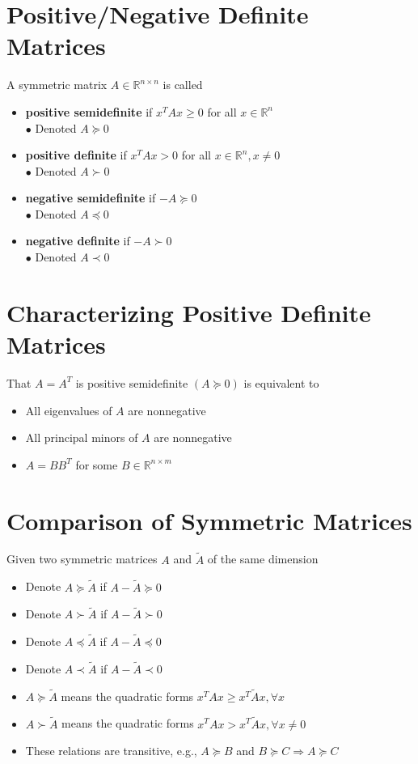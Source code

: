 \documentclass[10pt,a4paper,oneside]{article}
\begin{document}
\section{Positive/Negative Definite Matrices}
A symmetric matrix $A \in \mathbb{R}^{n \times n}$ is called
\begin{itemize}
\item {\bfseries positive semidefinite} if $x^{T} A x \geq 0$ for all $x \in \mathbb{R}^{n}$\\
$\bullet$ Denoted $A \succeq 0$
\item {\bfseries positive definite} if $x^{T} A x>0$ for all $x \in \mathbb{R}^{n}, x \neq 0$\\
$\bullet$ Denoted $A\succ0$
\item {\bfseries negative semidefinite} if $-A\succeq0$\\
$\bullet$ Denoted $A\preceq0$
\item {\bfseries negative definite} if $-A\succ0$\\
$\bullet$ Denoted $A\prec0$
\end{itemize}
\section{Characterizing Positive Definite Matrices}
That $A=A^{T}$ is positive semidefinite $(A \succeq 0)$ is equivalent to
\begin{itemize}
\item All eigenvalues of $A$ are nonnegative
\item All principal minors of $A$ are nonnegative
\item $A=B B^{T}$ for some $B \in \mathbb{R}^{n \times m}$
\end{itemize}
\section{Comparison of Symmetric Matrices}
Given two symmetric matrices $A$ and $\tilde{A}$ of the same dimension
\begin{itemize}
\item Denote $A \succeq \tilde{A}$ if $A-\tilde{A} \succeq 0$
\item Denote $A\succ\tilde{A}$ if $A-\tilde{A}\succ0$
\item Denote $A \preceq \tilde{A}$ if $A-\tilde{A} \preceq 0$
\item Denote $A\prec\tilde{A}$ if $A-\tilde{A}\prec0$
\item $A \succeq \tilde{A}$ means the quadratic forms $x^{T} A x \geq x^{T} \tilde{A} x, \forall x$
\item $A \succ \tilde{A}$ means the quadratic forms $x^{T} A x>x^{T} \tilde{A} x, \forall x \neq 0$
\item These relations are transitive, e.g., $A \succeq B$ and $B \succeq C \Rightarrow A \succeq C$
\end{itemize}
\end{document}
